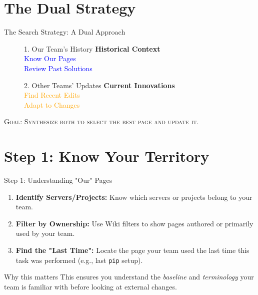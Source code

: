 \documentclass{beamer}
\begin{document}
	\section{The Dual Strategy}
	\begin{frame}{The Search Strategy: A Dual Approach}
		\begin{figure}
			\centering
			\begin{minipage}{0.45\textwidth}
				\begin{block}{1. Our Team's History}
					\centering
					\textbf{Historical Context}\\
					\vspace{0.5cm}
					\textcolor{blue}{Know Our Pages}\\
					\textcolor{blue}{Review Past Solutions}
				\end{block}
			\end{minipage}
			\hfill
			\begin{minipage}{0.45\textwidth}
				\begin{block}{2. Other Teams' Updates}
					\centering
					\textbf{Current Innovations}\\
					\vspace{0.5cm}
					\textcolor{orange}{Find Recent Edits}\\
					\textcolor{orange}{Adapt to Changes}
				\end{block}
			\end{minipage}
		\end{figure}
		\vspace{1cm}
		\begin{center}
			\textsc{Goal: Synthesize both to select the best page and update it.}
		\end{center}
	\end{frame}
	
	\section{Step 1: Know Your Territory}
	\begin{frame}{Step 1: Understanding "Our" Pages}
		\begin{enumerate}
			\item \textbf{Identify Servers/Projects:} Know which servers or projects belong to your team.
			\item \textbf{Filter by Ownership:} Use Wiki filters to show pages authored or primarily used by your team.
			\item \textbf{Find the "Last Time":} Locate the page your team used the last time this task was performed (e.g., last \texttt{pip} setup).
		\end{enumerate}
		\begin{exampleblock}{Why this matters}
			This ensures you understand the \textit{baseline} and \textit{terminology} your team is familiar with before looking at external changes.
		\end{exampleblock}
	\end{frame}
	
\end{document}
